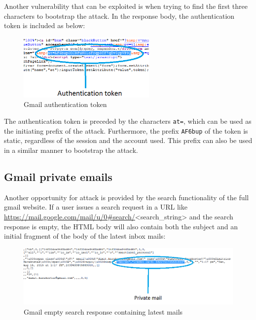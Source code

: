 Another vulnerability that can be exploited is when trying to find the first
three characters to bootstrap the attack. In the response body, the
authentication token is included as below:

\begin{figure}[h] \caption{Gmail authentication token} \centering
\includegraphics[width=0.6\textwidth]{diagrams/gmail_bootstrap.png}\end{figure}

The authentication token is preceded by the characters \texttt{at=}, which can
be used as the initiating prefix of the attack. Furthermore, the prefix
\texttt{AF6bup} of the token is static, regardless of the session and the
account used. This prefix can also be used in a similar manner to bootstrap the
attack.

\subsection{Gmail private emails}\label{subsec:gmail_mail}

Another opportunity for attack is provided by the search functionality of the
full gmail website. If a user issues a search request in a URL like
\url{https://mail.google.com/mail/u/0#search/}<search\_string> and the search
response is empty, the HTML body will also contain both the subject and an
initial fragment of the body of the latest inbox mails:

\begin{figure}[h] \caption{Gmail empty search response containing latest mails}
\centering
\includegraphics[width=1.1\textwidth]{diagrams/gmail_plain_response.png}\end{figure}

